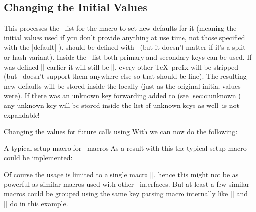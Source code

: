 \subsection{Changing the Initial Values\label{sec:c:change}}

\begin{function}{\ekvcChange}
  \begin{syntax}
    \kvarg
  \end{syntax}
  This processes the \kv\ list for the macro  to set new defaults for
  it (meaning the initial values used if you don't provide anything at use time,
  not those specified with the |default| \type).  should be defined
  with \expkvc\ (but it doesn't matter if it's a split or hash variant). Inside
  the \kv\ list both primary and secondary keys can be used. If  was
  defined |\long| earlier it will still be |\long|, every other \TeX\ prefix
  will be stripped (but \expkvc\ doesn't support them anywhere else so that
  should be fine). The resulting new defaults will be stored inside the
   locally (just as the original initial values were). If there was an
  unknown key forwarding added to  (see \autoref{sec:c:unknown}) any
  unknown key will be stored inside the list of unknown keys as well.
   is not expandable!
\end{function}
\begin{example}
    {Changing the values for future calls using }
  With  we can now do the following:
  \begin{enverb}
    \ekvcSplit{}
    \begingroup
      \ekvcChange{}
      \foo{}
      \ekvcSecondaryKeys{}
      \ekvcChange{}
      \foo{}
    \endgroup
    \foo{}
  \end{enverb}
\end{example}
\begin{example}{A typical setup macro for \expkvc\ macros}
  As a result with this the typical setup macro could be implemented:
  \begin{enverb}[no-tcb]
    \ekvcHashAndUse{}
    \def\fooA#1{\fooKV{#1}\fooAinternal}
    \def\fooB#1{\fooKV{#1}\fooBinternal}
    \protected\def\foosetup{\ekvcChange\fooKV}
  \end{enverb}
  Of course the usage is limited to a single macro |\fooKV|, hence this might
  not be as powerful as similar macros used with other \kv\ interfaces. But at
  least a few similar macros could be grouped using the same key parsing macro
  internally like |\fooA| and |\fooB| do in this example.
\end{example}


